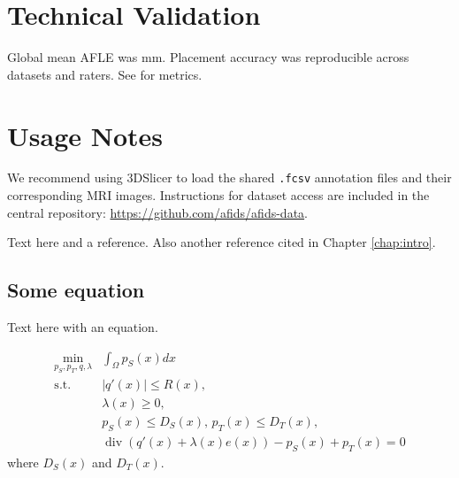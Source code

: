 \section{Technical Validation}
Global mean AFLE was  mm. Placement accuracy was reproducible across datasets and raters. See for metrics.

\section{Usage Notes}
We recommend using 3DSlicer to load the shared \texttt{.fcsv} annotation files and their corresponding MRI images. Instructions for dataset access are included in the central repository: \url{https://github.com/afids/afids-data}.

Text here and a reference. Also another reference cited in Chapter \ref{chap:intro}.

\subsection{Some equation}

Text here with an equation.

\begin{equation}
\begin{aligned}
\underset{p_S,p_T,q,\lambda} \min & \int_\Omega p_S(x)dx \\
\text{s.t. } & |q'(x)| \leq R(x) , \\
\text{ } & \lambda(x) \geq 0, \\
\text{ } & p_S(x) \leq D_S(x), \, p_T(x) \leq D_T(x), \\
\text{ } & \operatorname{div}\left( q'(x) + \lambda(x)e(x) \right) - p_S(x) + p_T(x) = 0
\label{eq:jingOpt}
\end{aligned}
\end{equation}
where $D_S(x)$ and $D_T(x)$.

